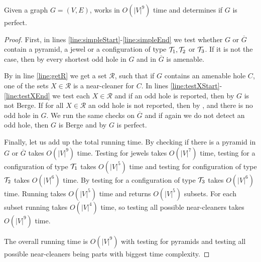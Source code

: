 \begin{theorem}
	Given a graph $G = (V, E)$,  works in $O(|V|^9)$ time and determines if $G$ is perfect.
\end{theorem}
\begin{proof}
	First, in lines \ref{line:simpleStart}-\ref{line:simpleEnd} we test whether $G$ or $\overline{G}$ contain a pyramid, a jewel or a configuration of type $\mathcal{T}_1, \mathcal{T}_2$ or $\mathcal{T}_3$. If it is not the case, then by  every shortest odd hole in $G$ and in $\overline{G}$ is amenable. 
	
	By  in line \ref{line:getR} we get a set $\mathcal{R}$, such that if $G$ contains an amenable hole $C$, one of the sets $X \in \mathcal{R}$ is a near-cleaner for $C$. In lines \ref{line:testXStart}-\ref{line:testXEnd} we test each $X \in \mathcal{R}$ and if an odd hole is reported, then by  $G$ is not Berge. If for all $X \in \mathcal{R}$ an odd hole is not reported, then by ,  and  there is no odd hole in $G$. We run the same checks on $\overline{G}$ and if again we do not detect an odd hole, then $G$ is Berge and by  $G$ is perfect.

	Finally, let us add up the total running time. By  checking if there is a pyramid in $G$ or $\overline{G}$ takes $O(|V|^9)$ time. Testing for jewels takes $O(|V|^7)$ time, testing for a configuration of type $\mathcal{T}_1$ takes $O(|V|^5)$ time and testing for configuration of type $\mathcal{T}_2$ takes $O(|V|^6)$ time. By  testing for a configuration of type $\mathcal{T}_3$ takes $O(|V|^6)$ time. Running  takes $O(|V|^5)$ time and returns $O(|V|^5)$ subsets. For each subset running  takes $O(|V|^4)$ time, so testing all possible near-cleaners takes $O(|V|^9)$ time.

	The overall running time is $O(|V|^9)$ with testing for pyramids and testing all possible near-cleaners being parts with biggest time complexity.
\end{proof}